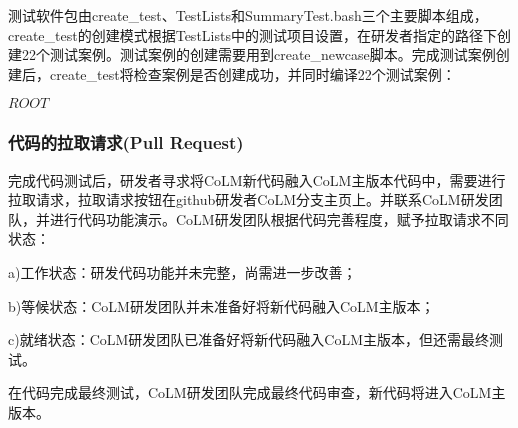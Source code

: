\documentclass[a4paper,12pt,twoside]{article}
\begin{document}
测试软件包由create\_test、TestLists和SummaryTest.bash三个主要脚本组成，create\_test的创建模式根据TestLists中的测试项目设置，在研发者指定的路径下创建22个测试案例。测试案例的创建需要用到create\_newcase脚本。完成测试案例创建后，create\_test将检查案例是否创建成功，并同时编译22个测试案例：

$ROOT$

\subsubsection{代码的拉取请求(Pull Request)}

完成代码测试后，研发者寻求将CoLM新代码融入CoLM主版本代码中，需要进行拉取请求，拉取请求按钮在github研发者CoLM分支主页上。并联系CoLM研发团队，并进行代码功能演示。CoLM研发团队根据代码完善程度，赋予拉取请求不同状态：

a)工作状态：研发代码功能并未完整，尚需进一步改善；

b)等候状态：CoLM研发团队并未准备好将新代码融入CoLM主版本；

c)就绪状态：CoLM研发团队已准备好将新代码融入CoLM主版本，但还需最终测试。

在代码完成最终测试，CoLM研发团队完成最终代码审查，新代码将进入CoLM主版本。
\end{document}
